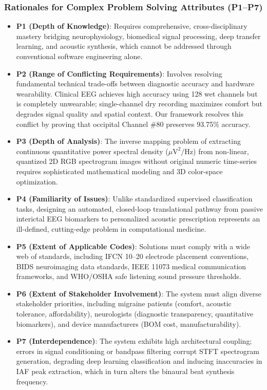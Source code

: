 \documentclass[12pt, a4paper]{report}
\begin{document}
\subsubsection{Rationales for Complex Problem Solving Attributes (P1--P7)}
\begin{itemize}
    \item \textbf{P1 (Depth of Knowledge)}: Requires comprehensive, cross-disciplinary mastery bridging neurophysiology, biomedical signal processing, deep transfer learning, and acoustic synthesis, which cannot be addressed through conventional software engineering alone.
    \item \textbf{P2 (Range of Conflicting Requirements)}: Involves resolving fundamental technical trade-offs between diagnostic accuracy and hardware wearability. Clinical EEG achieves high accuracy using 128 wet channels but is completely unwearable; single-channel dry recording maximizes comfort but degrades signal quality and spatial context. Our framework resolves this conflict by proving that occipital Channel \#80 preserves 93.75\% accuracy.
    \item \textbf{P3 (Depth of Analysis)}: The inverse mapping problem of extracting continuous quantitative power spectral density ($\mu\text{V}^2/\text{Hz}$) from non-linear, quantized 2D RGB spectrogram images without original numeric time-series requires sophisticated mathematical modeling and 3D color-space optimization.
    \item \textbf{P4 (Familiarity of Issues)}: Unlike standardized supervised classification tasks, designing an automated, closed-loop translational pathway from passive interictal EEG biomarkers to personalized acoustic prescription represents an ill-defined, cutting-edge problem in computational medicine.
    \item \textbf{P5 (Extent of Applicable Codes)}: Solutions must comply with a wide web of standards, including IFCN 10--20 electrode placement conventions, BIDS neuroimaging data standards, IEEE 11073 medical communication frameworks, and WHO/OSHA safe listening sound pressure thresholds.
    \item \textbf{P6 (Extent of Stakeholder Involvement)}: The system must align diverse stakeholder priorities, including migraine patients (comfort, acoustic tolerance, affordability), neurologists (diagnostic transparency, quantitative biomarkers), and device manufacturers (BOM cost, manufacturability).
    \item \textbf{P7 (Interdependence)}: The system exhibits high architectural coupling; errors in signal conditioning or bandpass filtering corrupt STFT spectrogram generation, degrading deep learning classification and inducing inaccuracies in IAF peak extraction, which in turn alters the binaural beat synthesis frequency.
\end{itemize}
\end{document}

